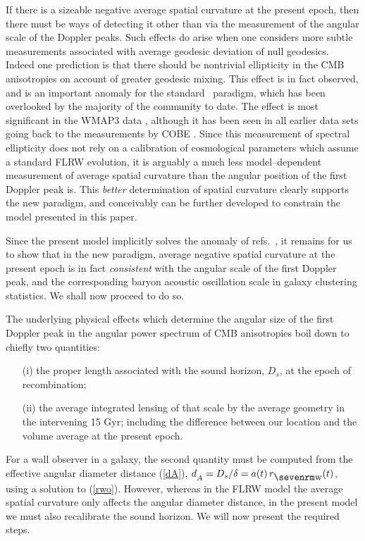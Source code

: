 \documentclass[12pt]{article}
\begin{document}
If there is a sizeable negative average spatial curvature at
the present epoch, then there must be ways of detecting it other than
via the measurement of the angular scale of the Doppler peaks.
Such effects do arise when one considers more subtle measurements associated
with average geodesic deviation of null geodesics.
Indeed one prediction is that there should be nontrivial ellipticity
in the CMB anisotropies on account of greater geodesic mixing.
This effect is in fact observed, and is an important anomaly for the
standard \LCDM\ paradigm, which has been overlooked by the majority of the
community to date. The effect is most significant in the WMAP3 data
\cite{elliptic2}, although it has been seen in all earlier data sets going
back to the measurements by COBE \cite{elliptic1}. Since this measurement
of spectral ellipticity does not rely
on a calibration of cosmological parameters which assume a standard
FLRW evolution, it is arguably a much less model--dependent measurement
of average spatial curvature than the angular position of the first
Doppler peak is. This {\em better} determination of spatial curvature clearly
supports the new paradigm, and conceivably can be further developed
to constrain the model presented in this paper.

Since the present model implicitly solves the anomaly of refs.\
\cite{elliptic2,elliptic1}, it remains for us to show that in the new
paradigm, average negative spatial curvature at the present epoch
is in fact {\em consistent} with the angular scale of the first Doppler
peak, and the corresponding baryon acoustic oscillation scale in
galaxy clustering statistics. We shall now proceed to do so.

The underlying physical effects which determine the angular size of
the first Doppler peak in the angular power spectrum of CMB anisotropies
boil down to chiefly two quantities:
\begin{itemize}
\item[(i)] the proper length associated
with the sound horizon, $D_s$, at the epoch of recombination;
\item[(ii)] the average
integrated lensing of that scale by the average geometry in the intervening
15 Gyr; including the difference between our location and the volume
average at the present epoch.
\end{itemize}
For a wall observer in a galaxy, the second quantity must be computed from
the effective angular diameter distance (\ref{dA}), $d\Z A=D_s/\de=\ac(\ts)
\,\rw(\ts)$, using a solution to (\ref{rwo}). However, whereas
in the FLRW model the average spatial curvature only affects the angular
diameter distance, in the present model we must also recalibrate the sound
horizon. We will now present the required steps.
\end{document}
